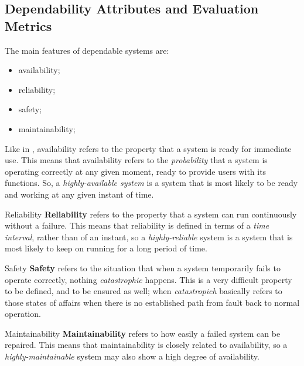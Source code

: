 \documentclass[11pt, a4paper]{article}
\begin{document}
\subsection{Dependability Attributes and Evaluation Metrics}\label{sub:dependability_attributes_and_evaluation_metrics} %
The main features of dependable systems are:
\begin{itemize}
    \item availability;
    \item reliability;
    \item safety;
    \item maintainability;
\end{itemize}
Like in , availability refers to the property that a system is ready for immediate use.
This means that availability refers to the \textit{probability} that a system is operating correctly at any given moment, ready to provide users with its functions.
So, a \textit{highly-available system} is a system that is most likely to be ready and working at any given instant of time.
\begin{definition}{Reliability}{}
    \textbf{Reliability} refers to the property that a system can run continuously without a failure.
    This means that reliability is defined in terms of a \textit{time interval}, rather than of an instant, so a \textit{highly-reliable} system is a system that is most likely to keep on running for a long period of time.
\end{definition}
\begin{definition}{Safety}{}
    \textbf{Safety} refers to the situation that when a system temporarily fails to operate correctly, nothing \textit{catastrophic} happens.
    This is a very difficult property to be defined, and to be ensured as well; when \textit{catastropich} basically refers to those states of affairs when there is no established path from fault back to normal operation.
\end{definition}
\begin{definition}{Maintainability}{}
    \textbf{Maintainability} refers to how easily a failed system can be repaired.
    This means that maintainability is closely related to availability, so a \textit{highly-maintainable} system may also show a high degree of availability.
\end{definition}
%
\end{document}
